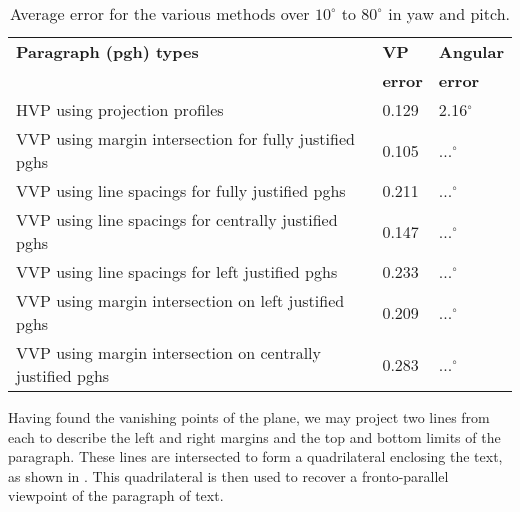 \begin{table}[t]
  \begin{center}
    \begin{tabular}{|p{95mm}|l|l|}
      \hline
      {\bf Paragraph (pgh) types } & {\bf VP} & {\bf Angular} \\
      {\bf } & {\bf error} & {\bf error} \\  \hline \hline
      HVP using projection profiles & 0.129 & 2.16$^\circ$ \\  \hline
      VVP using margin intersection for fully justified pghs & 0.105 & ...$^\circ$ \\ \hline
      VVP using line spacings for fully justified pghs & 0.211 & ...$^\circ$ \\ \hline
      VVP using line spacings for centrally justified pghs & 0.147 & ...$^\circ$ \\ \hline
      VVP using line spacings for left justified pghs & 0.233 & ...$^\circ$ \\ \hline
      VVP using margin intersection on left justified pghs & 0.209 & ...$^\circ$ \\   \hline
      VVP using margin intersection on centrally justified pghs & 0.283 & ...$^\circ$ \\ \hline  \hline
   \end{tabular}
  \end{center}
  \caption{Average error for the various methods over $10^\circ$ to $80^{\circ}$ in yaw and pitch.}
  \label{accuracytable}
\end{table}

Having found the vanishing points of the plane, we may project two lines from each
to describe the left and right margins and the top and bottom limits of the paragraph.
These lines are intersected to form a quadrilateral enclosing the text,
as shown in . %
This quadrilateral is then used to recover a fronto-parallel viewpoint
of the paragraph of text.





